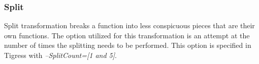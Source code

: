 \subsubsection{Split}
Split transformation breaks a function into less conspicuous pieces that are their own functions. The option utilized for this transformation is an attempt at the number of times the splitting needs to be performed. This option is specified in Tigress with \textit{--SplitCount=[1 and 5]}.


